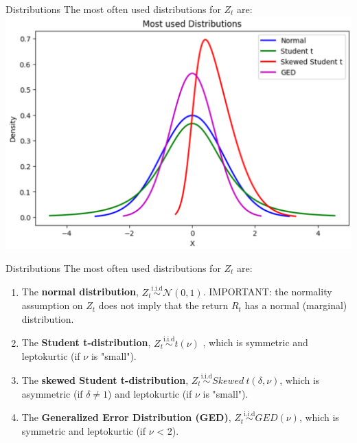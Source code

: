 \documentclass{beamer}
\def\N{\mathcal{N}}
\newcommand{\imfbold}[1]{\textbf{\textcolor{imfblue}{#1}}}
\begin{document}
\begin{frame}{Distributions}
The most often used distributions for $Z_t$ are:
\centering
    \includegraphics[width=.9\textwidth]{static/course_3_img/common_distrib.png}
\end{frame}
\begin{frame}{Distributions}
The most often used distributions for $Z_t$ are:
        \begin{enumerate}
            \item The \imfbold{normal distribution}, $Z_t \overset{\mathrm{i.i.d}}{\sim} \N(0,1)$. IMPORTANT: the normality assumption on $Z_t$ does not imply that the return $R_t$ has a normal (marginal) distribution.
            \item The \imfbold{Student t-distribution}, $Z_t \overset{\mathrm{i.i.d}}{\sim} t(\nu)$ , which is symmetric and leptokurtic (if $\nu$ is "small").
            \item The \imfbold{skewed Student t-distribution}, $Z_t \overset{\mathrm{i.i.d}}{\sim} Skewed~t(\delta,\nu)$, which is asymmetric (if $\delta \neq 1$) and leptokurtic (if $\nu$ is "small").
            \item The \imfbold{Generalized Error Distribution (GED)}, $Z_t \overset{\mathrm{i.i.d}}{\sim} GED(\nu)$, which is symmetric and leptokurtic (if $\nu$ < 2).
        \end{enumerate}

\end{frame}
\end{document}
